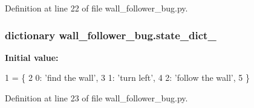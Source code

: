 Definition at line 22 of file wall\+\_\+follower\+\_\+bug.\+py.

\subsubsection[{\texorpdfstring{state\+\_\+dict\+\_\+}{state_dict_}}]{\setlength{\rightskip}{0pt plus 5cm}dictionary wall\+\_\+follower\+\_\+bug.\+state\+\_\+dict\+\_\+}\hypertarget{namespacewall__follower__bug_ac57f08afcea951e9b48786db2bda0516}{}\label{namespacewall__follower__bug_ac57f08afcea951e9b48786db2bda0516}
{\bfseries Initial value\+:}
\begin{DoxyCode}
1 = \{
2     0: \textcolor{stringliteral}{'find the wall'},
3     1: \textcolor{stringliteral}{'turn left'},
4     2: \textcolor{stringliteral}{'follow the wall'},
5 \}
\end{DoxyCode}


Definition at line 23 of file wall\+\_\+follower\+\_\+bug.\+py.

